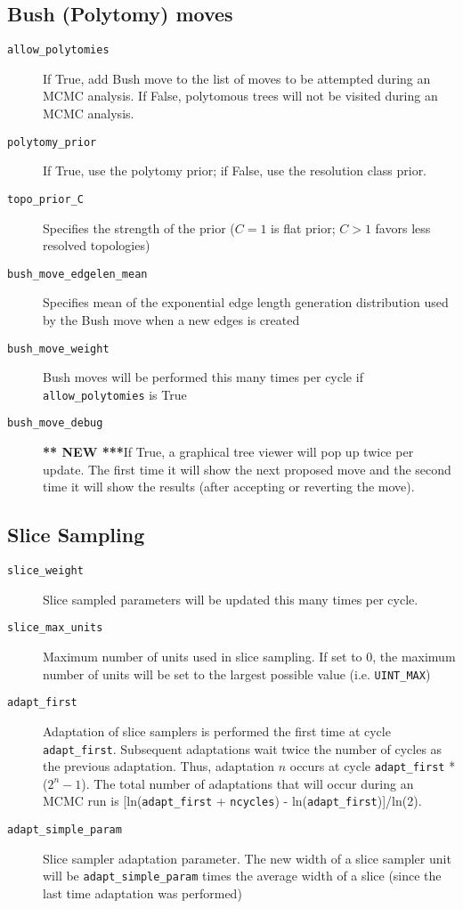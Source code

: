 \documentclass[10pt]{article}
\newcommand{\new}{{\bfseries *** NEW ***}}
\begin{document}
\subsection{Bush (Polytomy) moves}
\begin{description}
\item[{\tt allow\_polytomies}] If True, add Bush move to the list of moves to be attempted during an MCMC analysis. If False, polytomous trees will not be visited during an MCMC analysis.
\item[{\tt polytomy\_prior}] If True, use the polytomy prior; if False, use the resolution class prior.
\item[{\tt topo\_prior\_C}] Specifies the strength of the prior ($C = 1$ is flat prior; $C > 1$ favors less resolved topologies)
\item[{\tt bush\_move\_edgelen\_mean}] Specifies mean of the exponential edge length generation distribution used by the Bush move when a new edges is created
\item[{\tt bush\_move\_weight}] Bush moves will be performed this many times per cycle if \verb+allow_polytomies+ is True
\item[{\tt bush\_move\_debug}] \new If True, a graphical tree viewer will pop up twice per update. The first time it will show the next proposed move and the second time it will show the results (after accepting or reverting the move).
\end{description}

\subsection{Slice Sampling}
\begin{description}
\item[{\tt slice\_weight}] Slice sampled parameters will be updated this many times per cycle.
\item[{\tt slice\_max\_units}] Maximum number of units used in slice sampling. If set to 0, the maximum number of units will be set to the largest possible value (i.e. \verb+UINT_MAX+)
\item[{\tt adapt\_first}] Adaptation of slice samplers is performed the first time at cycle \verb+adapt_first+. Subsequent adaptations wait twice the number of cycles as the previous adaptation. Thus, adaptation $n$ occurs at cycle \verb+adapt_first+ * ($2^n - 1$). The total number of adaptations that will occur during an MCMC run is [ln(\verb+adapt_first+ + \verb+ncycles+) - ln(\verb+adapt_first+)]/ln(2).
\item[{\tt adapt\_simple\_param}] Slice sampler adaptation parameter. The new width of a slice sampler unit will be \verb+adapt_simple_param+ times the average width of a slice (since the last time adaptation was performed)
\end{description}
\end{document}
